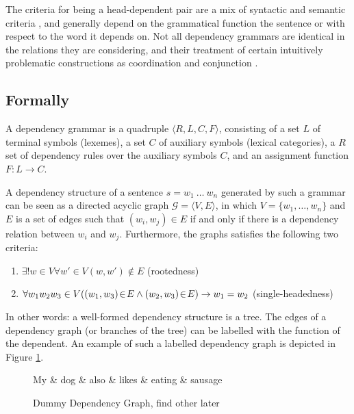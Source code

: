 \documentclass{report}
\theoremstyle{definition}
\theoremstyle{plain}
\begin{document}
The criteria for being a head-dependent pair are a mix of syntactic and semantic criteria \citep{nivre2005dependency}, and generally depend on the grammatical function the sentence or with respect to the word it depends on. Not all dependency grammars are identical in the relations they are considering, and their treatment of certain intuitively problematic constructions as coordination and conjunction \citep{nivre2005dependency}.

\subsection{Formally}

A dependency grammar is a quadruple $\langle R,L,C,F\rangle$, consisting of a set $L$ of terminal symbols (lexemes), a set $C$ of auxiliary symbols (lexical categories), a $R$ set of dependency rules over the auxiliary symbols $C$, and an assignment function $F : L\rightarrow C$.\citep{hays1964dependency,gaifman1965dependency}

A dependency structure of a sentence $s = w_1~\ldots~w_n$ generated by such a grammar can be seen as a directed acyclic graph $\mathcal{G} = \langle V, E\rangle$, in which $V = \{w_1, \ldots,w_n\}$ and $E$ is a set of edges such that $(w_i,w_j)\in E$ if and only if there is a dependency relation between $w_i$ and $w_j$. Furthermore, the graphs satisfies the following two criteria:
\begin{enumerate}
\item $\exists! w\in V \forall w'\in V (w,w')\notin E$ (rootedness)
\item $\forall w_1 w_2 w_3 \in V( (w_1,w_3)\negthinspace\in\negthinspace E \land (w_2,w_3)\negthinspace \in\negthinspace E ) \rightarrow w_1 = w_2$ (single-headedness)
\end{enumerate} 

In other words: a well-formed dependency structure is a tree. The edges of a dependency graph (or branches of the tree) can be labelled with the function of the dependent. An example of such a labelled dependency graph is depicted in Figure \ref{fig:depgraph}.

\begin{figure}
\centering
\begin{dependency}[theme=simple]%
\begin{deptext}[column sep=.5cm, row sep=.1ex]
My \& dog \& also \& likes \& eating \& sausage \\
\end{deptext}
\end{dependency}
\caption{Dummy Dependency Graph, find other later}\label{fig:depgraph}
\end{figure}
\end{document}
